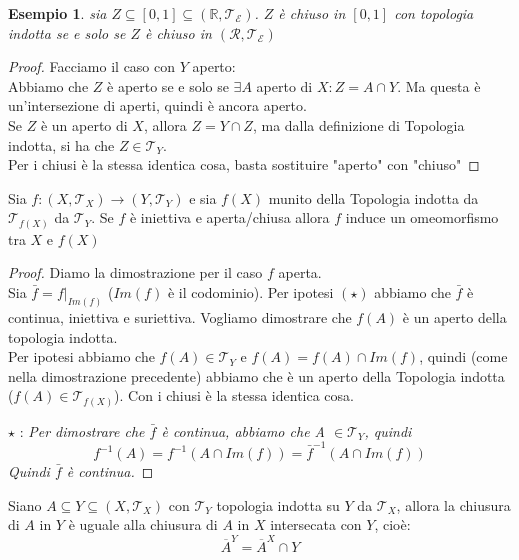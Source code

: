 \documentclass[11pt,a4paper,twoside]{article}
\newtheorem{es}{Esempio}
\theoremstyle{definition}
\begin{document}
\begin{es}
	sia $Z \subseteq [0,1] \subseteq (\mathbb R, \mathcal T_\mathcal E)$. $Z$ è chiuso in $[0,1]$ con topologia indotta se e solo se $Z$ è chiuso in $(\mathcal R, \mathcal T_\mathcal E)$
\end{es}

\begin{proof}
	Facciamo il caso con $Y$ aperto:\\
	\fbox{$\Rightarrow$} Abbiamo che $Z$ è aperto se e solo se $\exists A$ aperto di $X:Z = A \cap Y$. Ma questa è un'intersezione di aperti, quindi è ancora aperto.\\
	\fbox{$\Leftarrow$} Se $Z$ è un aperto di $X$, allora $Z = Y\cap Z$, ma dalla definizione di Topologia indotta, si ha che $Z \in \mathcal T_Y$.\\
	Per i chiusi è la stessa identica cosa, basta sostituire "aperto" con "chiuso"
\end{proof}

\begin{prop}{}{}
	Sia $f \colon (X, \mathcal T_X) \to (Y, \mathcal T_Y)$ e sia $f(X)$ munito della Topologia indotta da $\mathcal T_{f(X)}$ da $\mathcal T_Y$. Se $f$ è iniettiva e aperta/chiusa allora $f$ induce un omeomorfismo tra $X$ e $f(X)$
\end{prop}

\begin{proof}
	Diamo la dimostrazione per il caso $f$ aperta.\\
	Sia $\bar f = f{\big |}_{Im(f)}$ ($Im(f)$ è il codominio). Per ipotesi $(\star)$ abbiamo che $\bar f$ è continua, iniettiva e suriettiva. Vogliamo dimostrare che $f(A)$ è un aperto della topologia indotta.\\
	Per ipotesi abbiamo che $f(A) \in \mathcal T_Y$ e $f(A) = f(A) \cap Im(f)$, quindi (come nella dimostrazione precedente) abbiamo che è un aperto della Topologia indotta ($f(A) \in \mathcal T_{f(X)}$).
	Con i chiusi è la stessa identica cosa.

	$\star$ : \textit{Per dimostrare che $\bar f$ è continua, abbiamo che A $\in \mathcal T_Y$, quindi \[f^{-1}(A) = f^{-1}(A\cap Im(f)) = \bar f^{-1}(A \cap Im(f))\] Quindi $\bar f$ è continua.}
\end{proof}

\begin{prop}{}{}
	Siano $A \subseteq Y \subseteq (X, \mathcal T_X)$ con $\mathcal T_Y$ topologia indotta su $Y$ da $\mathcal T_X$, allora la chiusura di $A$ in $Y$ è uguale alla chiusura di $A$ in $X$ intersecata con $Y$, cioè:
	\[\overline A^Y = \overline A^X \cap Y\]
\end{prop}
\end{document}
